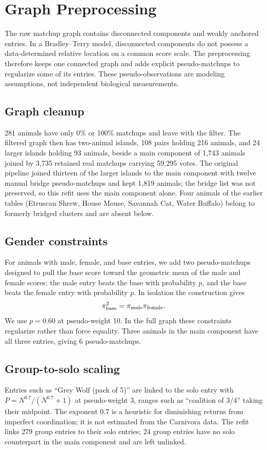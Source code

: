 \documentclass[11pt]{article}
\begin{document}
\section{Graph Preprocessing}
\label{sec:preprocess}

The raw matchup graph contains disconnected components and weakly anchored entries. In a Bradley--Terry model, disconnected components do not possess a data-determined relative location on a common score scale. The preprocessing therefore keeps one connected graph and adds explicit pseudo-matchups to regularize some of its entries. These pseudo-observations are modeling assumptions, not independent biological measurements.

\subsection{Graph cleanup}
281 animals have only 0\% or 100\% matchups and leave with the filter. The filtered graph then has two-animal islands, 108 pairs holding 216 animals, and 24 larger islands holding 93 animals, beside a main component of 1,743 animals joined by 3,735 retained real matchups carrying 59,295 votes. The original pipeline joined thirteen of the larger islands to the main component with twelve manual bridge pseudo-matchups and kept 1,819 animals; the bridge list was not preserved, so this refit uses the main component alone. Four animals of the earlier tables (Etruscan Shrew, House Mouse, Savannah Cat, Water Buffalo) belong to formerly bridged clusters and are absent below.

\subsection{Gender constraints}
For animals with male, female, and base entries, we add two pseudo-matchups designed to pull the base score toward the geometric mean of the male and female scores: the male entry beats the base with probability $p$, and the base beats the female entry with probability $p$. In isolation the construction gives
\[
\pi_{\rm base}^2=\pi_{\rm male}\pi_{\rm female}.
\]
We use $p=0.60$ at pseudo-weight 10. In the full graph these constraints regularize rather than force equality. Three animals in the main component have all three entries, giving 6 pseudo-matchups.

\subsection{Group-to-solo scaling}
Entries such as ``Grey Wolf (pack of 5)'' are linked to the solo entry with $P=N^{0.7}/(N^{0.7}+1)$ at pseudo-weight 3, ranges such as ``coalition of 3/4'' taking their midpoint. The exponent $0.7$ is a heuristic for diminishing returns from imperfect coordination; it is not estimated from the Carnivora data. The refit links 279 group entries to their solo entries; 24 group entries have no solo counterpart in the main component and are left unlinked.
\end{document}
